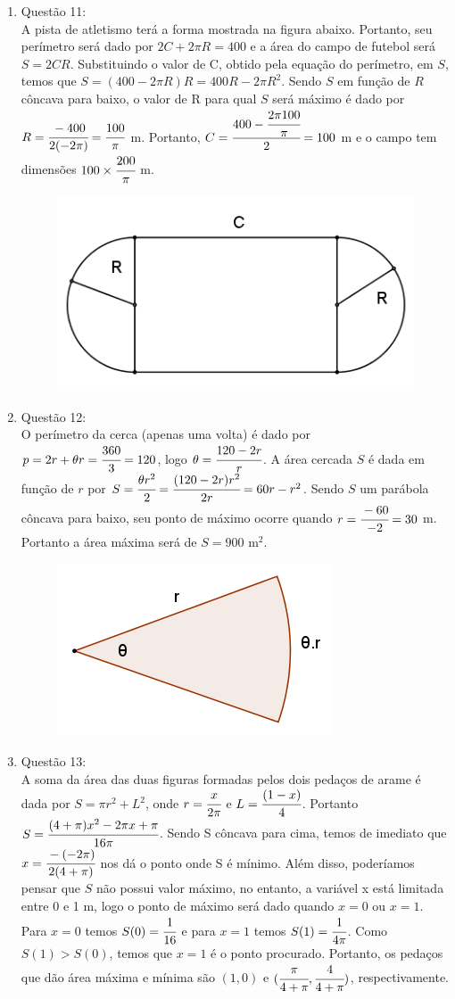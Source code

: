 \documentclass[a4paper]{report}
\begin{document}
\begin{enumerate}
		\item Questão 11:\\A pista de atletismo terá a forma mostrada na figura abaixo. Portanto, seu perímetro será dado por $2C + 2\pi R = 400$  e a área do campo de futebol será $S = 2CR$. Substituindo o valor de C, obtido pela equação do perímetro, em $S$, temos que $S=(400-2\pi R)R=400R-2\pi  R^2$. Sendo $S$ em função de $R$ côncava para baixo, o valor de R para qual $S$ será máximo é dado por $R=\cfrac{-400}{2(-2\pi)}=\cfrac{100}{\pi}$ m. Portanto, $C = \cfrac{400-\cfrac{2\pi 100}{\pi}}{2}=100$ m e o campo tem dimensões $100\times\cfrac{200}{\pi}$ m.

		\begin{figure}[!th]
			\centering
		 	\includegraphics[height=0.2\linewidth]{q11.png}
		\end{figure}	

		\item Questão 12:\\ O perímetro da cerca (apenas uma volta) é dado por $p=2r+\theta r = \cfrac{360}{3}=120$, logo $\theta = \cfrac{120-2r}{r}$. A área cercada $S$ é dada em função de $r$ por $S=\cfrac{\theta r^2}{2}=\cfrac{(120-2r)r^2}{2r}=60r-r^2$. Sendo $S$ um parábola côncava para baixo, seu ponto de máximo ocorre quando $r=\cfrac{-60}{-2}=30$ m. Portanto a área máxima será de $S=900$ m$^2$.

		\begin{figure}[!th]
			\centering
		 	\includegraphics[height=0.2\linewidth]{q12.png}
		\end{figure}

		\item Questão 13:\\ A soma da área das duas figuras formadas pelos dois pedaços de arame é dada por $S = \pi r^2 + L^2$, onde $r=\cfrac{x}{2\pi}$ e $L = \cfrac{(1-x)}{4}$. Portanto $S=\cfrac{(4+\pi)x^2-2\pi x+\pi}{16\pi}$. Sendo S côncava para cima, temos de imediato que $x=\cfrac{-(-2\pi)}{2(4+\pi)}$  nos dá o ponto onde S é mínimo. Além disso, poderíamos pensar que $S$ não possui valor máximo, no entanto, a variável x está limitada entre 0 e 1 m, logo o ponto de máximo será dado quando $x =0$ ou $x=1$. Para $x=0$ temos $S(0) = \cfrac{1}{16}$ e para $x=1$ temos $S(1)=\cfrac{1}{4\pi}$. Como $S(1) > S(0)$, temos que $x=1$ é o ponto procurado. Portanto, os pedaços que dão área máxima e mínima são $(1,0)$ e $(\cfrac{\pi}{4+\pi}, \cfrac{4}{4+\pi})$, respectivamente.


\end{enumerate}
\end{document}
